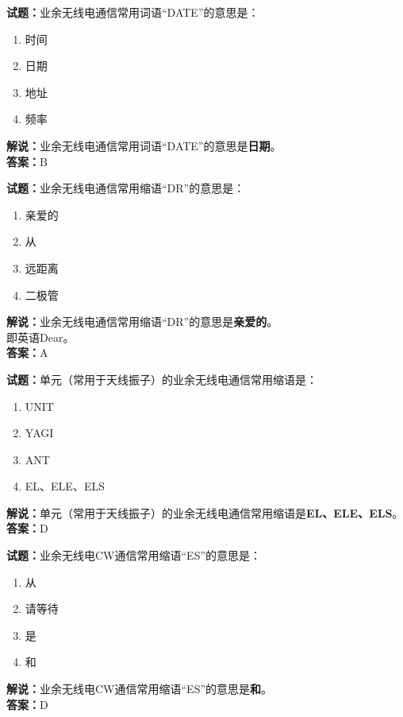 \documentclass{ctexbook}
\begin{document}
\bigskip


\noindent\textbf{试题：}业余无线电通信常用词语“DATE”的意思是：
\begin{enumerate}[leftmargin=3em]
\item 时间
\item 日期
\item 地址
\item 频率
\end{enumerate}
\noindent\textbf{解说：}业余无线电通信常用词语“DATE”的意思是\textbf{日期}。\\\noindent\textbf{答案：}B

\bigskip


\noindent\textbf{试题：}业余无线电通信常用缩语“DR”的意思是：
\begin{enumerate}[leftmargin=3em]
\item 亲爱的
\item 从
\item 远距离
\item 二极管
\end{enumerate}
\noindent\textbf{解说：}业余无线电通信常用缩语“DR”的意思是\textbf{亲爱的}。\\即英语Dear。\\\noindent\textbf{答案：}A

\bigskip


\noindent\textbf{试题：}单元（常用于天线振子）的业余无线电通信常用缩语是：
\begin{enumerate}[leftmargin=3em]
\item UNIT
\item YAGI
\item ANT
\item EL、ELE、ELS
\end{enumerate}
\noindent\textbf{解说：}单元（常用于天线振子）的业余无线电通信常用缩语是\textbf{EL、ELE、ELS}。\\\noindent\textbf{答案：}D

\bigskip


\noindent\textbf{试题：}业余无线电CW通信常用缩语“ES”的意思是：
\begin{enumerate}[leftmargin=3em]
\item 从
\item 请等待
\item 是
\item 和
\end{enumerate}
\noindent\textbf{解说：}业余无线电CW通信常用缩语“ES”的意思是\textbf{和}。\\\noindent\textbf{答案：}D
\end{document}
